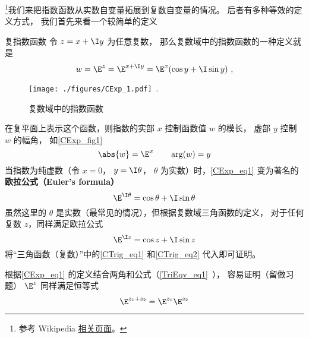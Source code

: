 
\begin{issues}
\issueTODO
\end{issues}



\footnote{参考 Wikipedia \href{https://en.wikipedia.org/wiki/Euler's_formula}{相关页面}。}我们来把指数函数从实数自变量拓展到复数自变量的情况。 后者有多种等效的定义方式， 我们首先来看一个较简单的定义

\begin{definition}{复指数函数}
令 $z = x + \I y$ 为任意复数， 那么复数域中的指数函数的一种定义就是
\begin{equation}\label{CExp_eq1}
w = \E^z = \E^{x + \I y} = \E^x(\cos y + \I\sin y)~,
\end{equation}
\end{definition}

\begin{figure}[ht]
\centering
\texttt{[image: ./figures/CExp\_1.pdf]}~.
\caption{复数域中的指数函数} \label{CExp_fig1}
\end{figure}

在复平面上表示这个函数，则指数的实部 $x$ 控制函数值 $w$ 的模长， 虚部 $y$ 控制 $w$ 的幅角， 如\autoref{CExp_fig1}
 \begin{equation}
\abs{w} = \E^x \qquad \arg(w) = y
\end{equation}
当指数为纯虚数（令 $x = 0$， $y = \I\theta$， $\theta$ 为实数）时，\autoref{CExp_eq1} 变为著名的\textbf{欧拉公式（Euler's formula）}
\begin{equation}\label{CExp_eq2}
\E^{\I \theta} = \cos \theta + \I\sin \theta
\end{equation}
虽然这里的 $\theta$ 是实数（最常见的情况），但根据复数域三角函数的定义， 对于任何复数 $z$，同样满足欧拉公式
\begin{equation}
\E^{\I z} = \cos z + \I\sin z
\end{equation}
将“三角函数（复数）”中的\autoref{CTrig_eq1} 和\autoref{CTrig_eq2} 代入即可证明。

根据\autoref{CExp_eq1} 的定义结合两角和公式（\autoref{TriEqv_eq1}~）， 容易证明（留做习题） $\E^z$ 同样满足恒等式
\begin{equation}
\E^{z_1 + z_2} = \E^{z_1}\E^{z_2}
\end{equation}

